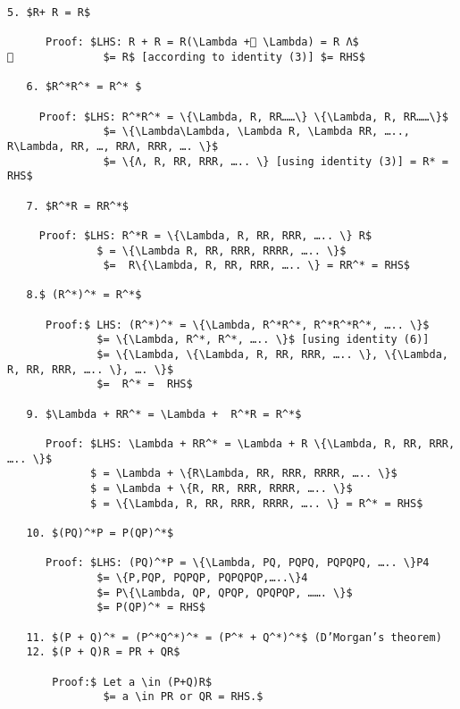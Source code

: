 \newpage
\begin{quote}
\footnotesize
\end{quote}
\begin{lstlisting}[mathescape=true]
   5. $R+ R = R$

      Proof: $LHS: R + R = R(\Lambda + \Lambda) = R Λ$
              $= R$ [according to identity (3)] $= RHS$

   6. $R^*R^* = R^* $

     Proof: $LHS: R^*R^* = \{\Lambda, R, RR……\} \{\Lambda, R, RR……\}$
               $= \{\Lambda\Lambda, \Lambda R, \Lambda RR, ….., R\Lambda, RR, …, RRΛ, RRR, …. \}$
               $= \{Λ, R, RR, RRR, ….. \} [using identity (3)] = R* = RHS$

   7. $R^*R = RR^*$

     Proof: $LHS: R^*R = \{\Lambda, R, RR, RRR, ….. \} R$
              $ = \{\Lambda R, RR, RRR, RRRR, ….. \}$
               $=  R\{\Lambda, R, RR, RRR, ….. \} = RR^* = RHS$

   8.$ (R^*)^* = R^*$

      Proof:$ LHS: (R^*)^* = \{\Lambda, R^*R^*, R^*R^*R^*, ….. \}$
              $= \{\Lambda, R^*, R^*, ….. \}$ [using identity (6)]
              $= \{\Lambda, \{\Lambda, R, RR, RRR, ….. \}, \{\Lambda, R, RR, RRR, ….. \}, …. \}$
              $=  R^* =  RHS$

   9. $\Lambda + RR^* = \Lambda +  R^*R = R^*$

      Proof: $LHS: \Lambda + RR^* = \Lambda + R \{\Lambda, R, RR, RRR, ….. \}$
             $ = \Lambda + \{R\Lambda, RR, RRR, RRRR, ….. \}$
             $ = \Lambda + \{R, RR, RRR, RRRR, ….. \}$
             $ = \{\Lambda, R, RR, RRR, RRRR, ….. \} = R^* = RHS$

   10. $(PQ)^*P = P(QP)^*$

      Proof: $LHS: (PQ)^*P = \{\Lambda, PQ, PQPQ, PQPQPQ, ….. \}P4
              $= \{P,PQP, PQPQP, PQPQPQP,…..\}4
              $= P\{\Lambda, QP, QPQP, QPQPQP, ……. \}$
              $= P(QP)^* = RHS$

   11. $(P + Q)^* = (P^*Q^*)^* = (P^* + Q^*)^*$ (D’Morgan’s theorem)
   12. $(P + Q)R = PR + QR$

       Proof:$ Let a \in (P+Q)R$
               $= a \in PR or QR = RHS.$
\end{lstlisting}

